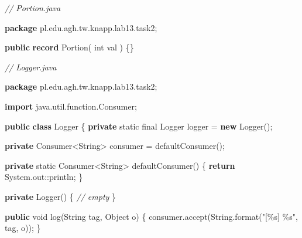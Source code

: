 \documentclass[11pt]{article}
\newenvironment{Shaded}{}{}
\newcommand{\KeywordTok}[1]{\textcolor[rgb]{0.00,0.44,0.13}{\textbf{{#1}}}}
\newcommand{\DataTypeTok}[1]{\textcolor[rgb]{0.56,0.13,0.00}{{#1}}}
\newcommand{\StringTok}[1]{\textcolor[rgb]{0.25,0.44,0.63}{{#1}}}
\newcommand{\CommentTok}[1]{\textcolor[rgb]{0.38,0.63,0.69}{\textit{{#1}}}}
\newcommand{\FunctionTok}[1]{\textcolor[rgb]{0.02,0.16,0.49}{{#1}}}
\newcommand{\NormalTok}[1]{{#1}}
\newcommand{\SpecialCharTok}[1]{\textcolor[rgb]{0.25,0.44,0.63}{{#1}}}
\newcommand{\ImportTok}[1]{{#1}}
\newcommand{\ControlFlowTok}[1]{\textcolor[rgb]{0.00,0.44,0.13}{\textbf{{#1}}}}
\newcommand{\OperatorTok}[1]{\textcolor[rgb]{0.40,0.40,0.40}{{#1}}}
\newcommand{\BuiltInTok}[1]{{#1}}
\begin{document}
    \begin{Shaded}
\begin{Highlighting}[]
\CommentTok{// Portion.java}

\KeywordTok{package}\ImportTok{ pl}\OperatorTok{.}\ImportTok{edu}\OperatorTok{.}\ImportTok{agh}\OperatorTok{.}\ImportTok{tw}\OperatorTok{.}\ImportTok{knapp}\OperatorTok{.}\ImportTok{lab13}\OperatorTok{.}\ImportTok{task2}\OperatorTok{;}

\KeywordTok{public} \KeywordTok{record} \FunctionTok{Portion}\OperatorTok{(}
    \DataTypeTok{int}\NormalTok{ val}
\OperatorTok{)} \OperatorTok{\{\}}
\end{Highlighting}
\end{Shaded}

    \begin{Shaded}
\begin{Highlighting}[]
\CommentTok{// Logger.java}

\KeywordTok{package}\ImportTok{ pl}\OperatorTok{.}\ImportTok{edu}\OperatorTok{.}\ImportTok{agh}\OperatorTok{.}\ImportTok{tw}\OperatorTok{.}\ImportTok{knapp}\OperatorTok{.}\ImportTok{lab13}\OperatorTok{.}\ImportTok{task2}\OperatorTok{;}

\KeywordTok{import} \ImportTok{java}\OperatorTok{.}\ImportTok{util}\OperatorTok{.}\ImportTok{function}\OperatorTok{.}\ImportTok{Consumer}\OperatorTok{;}

\KeywordTok{public} \KeywordTok{class} \BuiltInTok{Logger} \OperatorTok{\{}
    \KeywordTok{private} \DataTypeTok{static} \DataTypeTok{final} \BuiltInTok{Logger}\NormalTok{ logger }\OperatorTok{=} \KeywordTok{new} \BuiltInTok{Logger}\OperatorTok{();}

    \KeywordTok{private}\NormalTok{ Consumer}\OperatorTok{\textless{}}\BuiltInTok{String}\OperatorTok{\textgreater{}}\NormalTok{ consumer }\OperatorTok{=} \FunctionTok{defaultConsumer}\OperatorTok{();}

    \KeywordTok{private} \DataTypeTok{static}\NormalTok{ Consumer}\OperatorTok{\textless{}}\BuiltInTok{String}\OperatorTok{\textgreater{}} \FunctionTok{defaultConsumer}\OperatorTok{()} \OperatorTok{\{}
        \ControlFlowTok{return} \BuiltInTok{System}\OperatorTok{.}\FunctionTok{out}\OperatorTok{::}\NormalTok{println}\OperatorTok{;}
    \OperatorTok{\}}

    \KeywordTok{private} \BuiltInTok{Logger}\OperatorTok{()} \OperatorTok{\{}
        \CommentTok{// empty}
    \OperatorTok{\}}

    \KeywordTok{public} \DataTypeTok{void} \FunctionTok{log}\OperatorTok{(}\BuiltInTok{String}\NormalTok{ tag}\OperatorTok{,} \BuiltInTok{Object}\NormalTok{ o}\OperatorTok{)} \OperatorTok{\{}
\NormalTok{        consumer}\OperatorTok{.}\FunctionTok{accept}\OperatorTok{(}\BuiltInTok{String}\OperatorTok{.}\FunctionTok{format}\OperatorTok{(}\StringTok{"[}\SpecialCharTok{\%s}\StringTok{] }\SpecialCharTok{\%s}\StringTok{"}\OperatorTok{,}\NormalTok{ tag}\OperatorTok{,}\NormalTok{ o}\OperatorTok{));}
    \OperatorTok{\}}


\end{Highlighting}
\end{Shaded}
\end{document}
